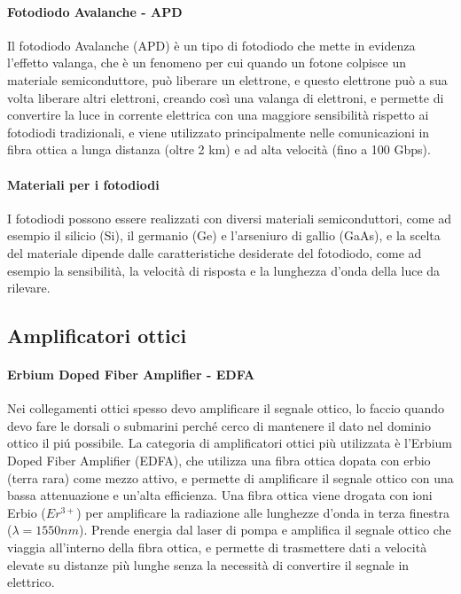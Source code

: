 \paragraph{Fotodiodo Avalanche - APD}
Il fotodiodo Avalanche (APD) è un tipo di fotodiodo che mette in evidenza l'effetto valanga, che è un fenomeno per cui quando un fotone colpisce un materiale semiconduttore, 
può liberare un elettrone, e questo elettrone può a sua volta liberare altri elettroni, creando così una valanga di elettroni, e permette di convertire la luce in corrente elettrica 
con una maggiore sensibilità rispetto ai fotodiodi tradizionali, e viene utilizzato principalmente nelle comunicazioni in fibra ottica a lunga distanza (oltre 2 km) e ad alta 
velocità (fino a 100 Gbps).\\

\paragraph{Materiali per i fotodiodi}
I fotodiodi possono essere realizzati con diversi materiali semiconduttori, come ad esempio il silicio (Si), il germanio (Ge) e l'arseniuro di gallio (GaAs), 
e la scelta del materiale dipende dalle caratteristiche desiderate del fotodiodo, come ad esempio la sensibilità, la velocità di risposta e la lunghezza d'onda della luce da rilevare.\\

\subsection{Amplificatori ottici}
\paragraph{Erbium Doped Fiber Amplifier - EDFA}
Nei collegamenti ottici spesso devo amplificare il segnale ottico, lo faccio quando devo fare le dorsali o submarini perché cerco di mantenere il dato nel dominio ottico il piú possibile.
La categoria di amplificatori ottici più utilizzata è l'Erbium Doped Fiber Amplifier (EDFA), che utilizza una fibra ottica dopata con erbio (terra rara) come mezzo attivo, 
e permette di amplificare il segnale ottico con una bassa attenuazione e un'alta efficienza.
Una fibra ottica viene drogata con ioni Erbio ($Er^{3+}$) per amplificare la radiazione alle lunghezze d'onda in terza finestra ($\lambda = 1550 nm$).
Prende energia dal laser di pompa e amplifica il segnale ottico che viaggia all'interno della fibra ottica, e permette di trasmettere dati a velocità elevate su distanze più 
lunghe senza la necessità di convertire il segnale in elettrico.\\

